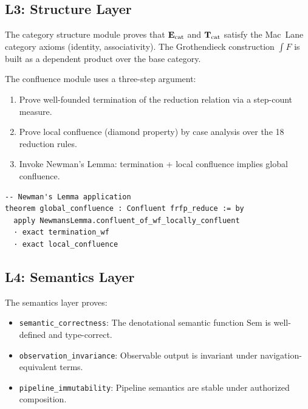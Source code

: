 \subsection{L3: Structure Layer}


The category structure module proves that \(\mathbf{E}_{\mathrm{cat}}\) and \(\mathbf{T}_{\mathrm{cat}}\) satisfy the
Mac~Lane category axioms (identity, associativity). The Grothendieck construction
\(\int F\) is built as a dependent product over the base category.


The confluence module uses a three-step argument:
\begin{enumerate}
  \item Prove well-founded termination of the reduction relation via a step-count
        measure.
  \item Prove local confluence (diamond property) by case analysis over the 18
        reduction rules.
  \item Invoke Newman's Lemma: termination + local confluence implies global
        confluence.
\end{enumerate}

\begin{lstlisting}
-- Newman's Lemma application
theorem global_confluence : Confluent frfp_reduce := by
  apply NewmansLemma.confluent_of_wf_locally_confluent
  · exact termination_wf
  · exact local_confluence
\end{lstlisting}

\subsection{L4: Semantics Layer}


The semantics layer proves:
\begin{itemize}
  \item \texttt{semantic\_correctness}: The denotational semantic function
        \(\mathrm{Sem}\) is well-defined and type-correct.
  \item \texttt{observation\_invariance}: Observable output is invariant under
        navigation-equivalent terms.
  \item \texttt{pipeline\_immutability}: Pipeline semantics are stable under
        authorized composition.
\end{itemize}

